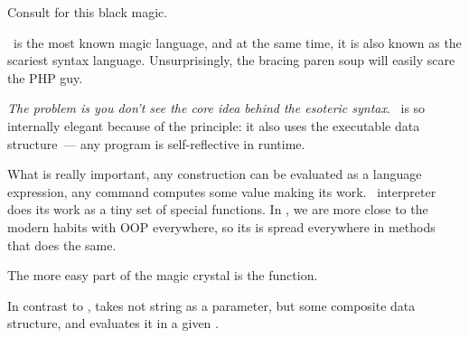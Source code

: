 \clearpage
{}\secdown


Consult \cite[chapter 4]{SICP} for this black magic.


\clearpage
\lisp\ is the most known magic language, and at the same time, it is also known
as the scariest syntax language. Unsurprisingly, the bracing paren soup will
easily scare the PHP guy.

\textit{The problem is you don't see the core idea behind the esoteric syntax}.
\lisp\ is so internally elegant because of the principle: it also uses the
executable data structure\ --- any program is self-reflective in
runtime.

What is really important, any construction can be evaluated as a language
expression, any command computes some value making its work. \lisp\ interpreter
does its work as a tiny set of special functions. In \mel, we are more close to
the modern habits with OOP everywhere, so its  is spread
everywhere in methods that does the same.

\clearpage
{}\label{eval}

The more easy part of the magic crystal is the  function.

In contrast to \py,  takes not string as a parameter, but some
composite data structure, and evaluates it in a given
.

\label{apply}

\secup
